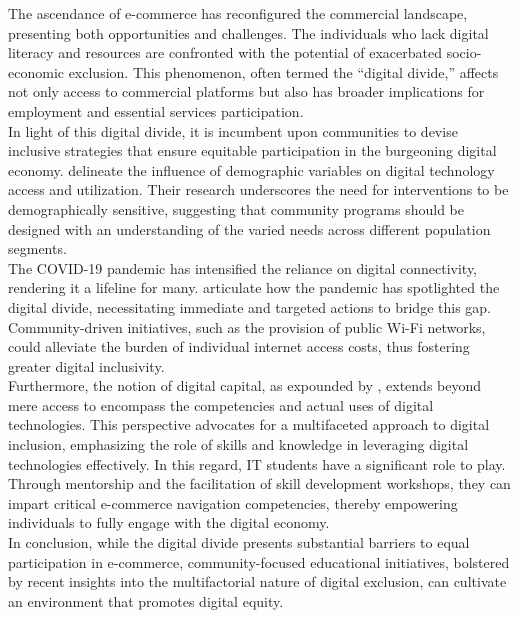 \documentclass[12pt,a4paper]{article}
\begin{document}
The ascendance of e-commerce has reconfigured the commercial landscape, presenting both opportunities and challenges. The individuals who lack digital literacy and resources are confronted with the potential of exacerbated socio-economic exclusion. This phenomenon, often termed the ``digital divide,'' affects not only access to commercial platforms but also has broader implications for employment and essential services participation.\\ 

\noindent In light of this digital divide, it is incumbent upon communities to devise inclusive strategies that ensure equitable participation in the burgeoning digital economy. \citep{Ref1.3} delineate the influence of demographic variables on digital technology access and utilization. Their research underscores the need for interventions to be demographically sensitive, suggesting that community programs should be designed with an understanding of the varied needs across different population segments.\\

\noindent The COVID-19 pandemic has intensified the reliance on digital connectivity, rendering it a lifeline for many. \citep{Ref1.2} articulate how the pandemic has spotlighted the digital divide, necessitating immediate and targeted actions to bridge this gap. Community-driven initiatives, such as the provision of public Wi-Fi networks, could alleviate the burden of individual internet access costs, thus fostering greater digital inclusivity.\\ 

\noindent Furthermore, the notion of digital capital, as expounded by \citep{Ref1.1}, extends beyond mere access to encompass the competencies and actual uses of digital technologies. This perspective advocates for a multifaceted approach to digital inclusion, emphasizing the role of skills and knowledge in leveraging digital technologies effectively. In this regard, IT students have a significant role to play. Through mentorship and the facilitation of skill development workshops, they can impart critical e-commerce navigation competencies, thereby empowering individuals to fully engage with the digital economy.\\

\noindent In conclusion, while the digital divide presents substantial barriers to equal participation in e-commerce, community-focused educational initiatives, bolstered by recent insights into the multifactorial nature of digital exclusion, can cultivate an environment that promotes digital equity. 
\end{document}
